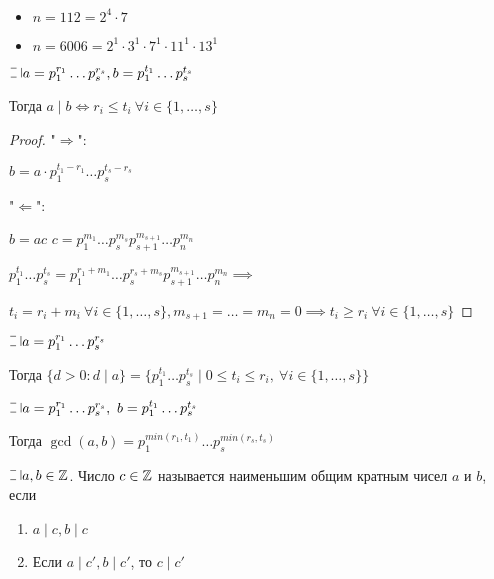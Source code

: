 \begin{examples}~

    \begin{itemize}
        \item $n = 112 = 2^4 \cdot 7$
        
        \item $n = 6006 = 2^1 \cdot 3^1 \cdot 7^1 \cdot 11^1 \cdot 13^1$
    \end{itemize}
\end{examples}

\begin{theorem-non}
    $\letus a = p_1^{r_1} \ldots p_s^{r_s}, b = p_1^{t_1} \ldots p_s^{t_s}$

    Тогда $a \mid b \iff r_i \leq t_i~\forall i \in \{1, \ldots, s\}$
\end{theorem-non}

\begin{proof}
    "$\Rightarrow$":
    
    $b = a \cdot p_1^{t_1 - r_1} \ldots p_s^{t_s - r_s}$
    
    "$\Leftarrow$":
    
    $b = ac$ $c = p_1^{m_1} \ldots p_s^{m_s} p_{s+1}^{m_{s+1}} \ldots p_n^{m_n}$
    
    $p_1^{t_1} \ldots p_s^{t_s} = p_1^{r_1 + m_1} \ldots p_s^{r_s + m_s} p_{s+1}^{m_{s+1}} \ldots p_n^{m_n} \implies$
    
    $t_i = r_i + m_i~\forall i \in \{1, \ldots, s\}, m_{s+1} = \ldots = m_n = 0 \implies t_i \geq r_i~\forall i \in \{1, \ldots, s\}$
\end{proof}

\begin{follow}
    $\letus a = p_1^{r_1} \ldots p_s^{r_s}$

    Тогда $\{d > 0 : d \mid a\} = \{p_1^{t_1} \ldots p_s^{t_s} \mid 0 \leq t_i \leq r_i,~\forall i \in \{1, \ldots, s\}\}$
\end{follow}

\begin{follow}
    $\letus a = p_1^{r_1} \ldots p_s^{r_s},~b = p_1^{t_1} \ldots p_s^{t_s}$

    Тогда $\gcd(a, b) = p_1^{min(r_1, t_1)} \ldots p_s^{min(r_s, t_s)}$
\end{follow}

\begin{defn}
    $\letus a, b \in \Z$. Число $c \in \mathbb{Z}$ называется наименьшим общим кратным чисел $a$ и $b$, если
    \begin{enumerate}
        \item $a \mid c, b \mid c$
        \item Если $a \mid c', b \mid c'$, то $c \mid c'$
    \end{enumerate}
\end{defn}

